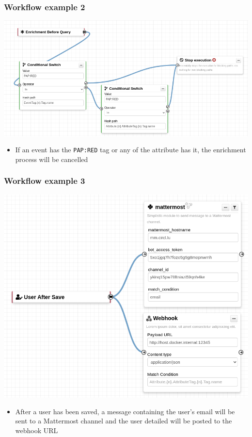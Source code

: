 \begin{frame}
    \frametitle{Workflow example 2}
    \begin{center}
        \includegraphics[width=0.95\linewidth]{pictures/example-2.png}
    \end{center}

    \begin{itemize}
        \item If an event has the \texttt{PAP:RED} tag or any of the attribute has it, the enrichment process will be cancelled
    \end{itemize}
\end{frame}

\begin{frame}
    \frametitle{Workflow example 3}
    \begin{center}
        \includegraphics[width=0.65\linewidth]{pictures/example-3.png}
    \end{center}

    \begin{itemize}
        \item After a user has been saved, a message containing the user's email will be sent to a Mattermost channel and the user detailed will be posted to the webhook URL
    \end{itemize}
\end{frame}

